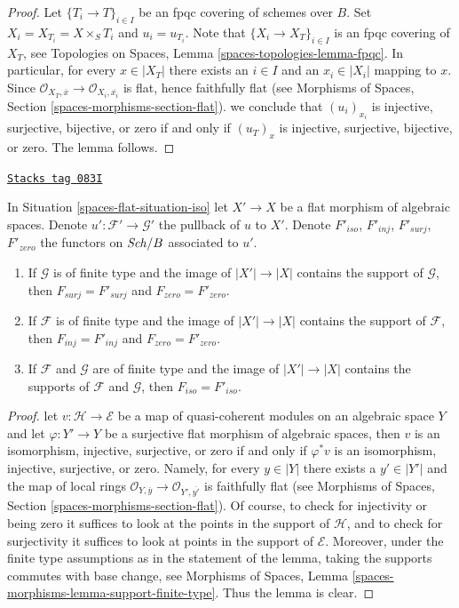 \begin{proof}
Let $\{T_i \to T\}_{i \in I}$ be an fpqc covering of schemes over $B$.
Set $X_i = X_{T_i} = X \times_S T_i$ and $u_i = u_{T_i}$.
Note that $\{X_i \to X_T\}_{i \in I}$ is an fpqc covering of $X_T$, see
Topologies on Spaces, Lemma \ref{spaces-topologies-lemma-fpqc}.
In particular, for every $x \in |X_T|$ there exists an $i \in I$
and an $x_i \in |X_i|$ mapping to $x$. Since
$\mathcal{O}_{X_T, \overline{x}} \to \mathcal{O}_{X_i, \overline{x_i}}$
is flat, hence faithfully flat (see
Morphisms of Spaces, Section \ref{spaces-morphisms-section-flat}).
we conclude that $(u_i)_{x_i}$ is injective, surjective, bijective, or zero
if and only if $(u_T)_x$ is injective, surjective, bijective, or zero.
The lemma follows.
\end{proof}

\begin{lemma}[Iso go up]
\label{spaces-flat-lemma-iso-go-up}
\href{https://stacks.math.columbia.edu/tag/083I}{\texttt{Stacks tag 083I}}

In Situation \ref{spaces-flat-situation-iso} let $X' \to X$ be a flat morphism
of algebraic spaces. Denote $u' : \mathcal{F}' \to \mathcal{G}'$
the pullback of $u$ to $X'$. Denote $F'_{iso}$, $F'_{inj}$, $F'_{surj}$,
$F'_{zero}$ the functors on $\mathit{Sch}/B$ associated to $u'$.
\begin{enumerate}
\item If $\mathcal{G}$ is of finite type and the image of $|X'| \to |X|$
contains the support of $\mathcal{G}$, then $F_{surj} = F'_{surj}$
and $F_{zero} = F'_{zero}$.
\item If $\mathcal{F}$ is of finite type and the image of $|X'| \to |X|$
contains the support of $\mathcal{F}$, then $F_{inj} = F'_{inj}$
and $F_{zero} = F'_{zero}$.
\item If $\mathcal{F}$ and $\mathcal{G}$ are of finite type and the image of
$|X'| \to |X|$ contains the supports of $\mathcal{F}$ and $\mathcal{G}$,
then $F_{iso} = F'_{iso}$.
\end{enumerate}
\end{lemma}

\begin{proof}
let $v : \mathcal{H} \to \mathcal{E}$ be a map of quasi-coherent
modules on an algebraic space $Y$ and let $\varphi : Y' \to Y$ be a
surjective flat morphism of algebraic spaces, then $v$ is
an isomorphism, injective, surjective, or zero if and only if $\varphi^*v$ is
an isomorphism, injective, surjective, or zero. Namely,
for every $y \in |Y|$ there exists a $y' \in |Y'|$ and the map
of local rings
$\mathcal{O}_{Y, \overline{y}} \to \mathcal{O}_{Y', \overline{y'}}$
is faithfully flat (see
Morphisms of Spaces, Section \ref{spaces-morphisms-section-flat}).
Of course, to check for injectivity or being zero it suffices to look
at the points in the support of $\mathcal{H}$, and to check for
surjectivity it suffices to look at points in the support of $\mathcal{E}$.
Moreover, under the finite type assumptions as in the statement of
the lemma, taking the supports commutes with base change, see
Morphisms of Spaces, Lemma \ref{spaces-morphisms-lemma-support-finite-type}.
Thus the lemma is clear.
\end{proof}

